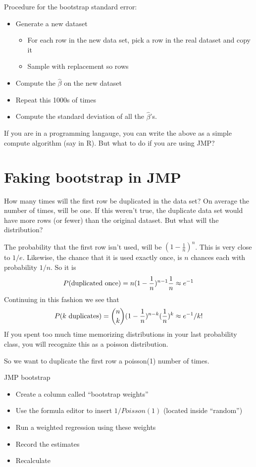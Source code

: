 \documentclass{article}
\begin{document}
Procedure for the bootstrap standard error:
\begin{itemize}
\item Generate a new dataset
\begin{itemize}
\item For each row in the new data set, pick a row in the real dataset
and copy it
\item Sample with replacement so rows 
\end{itemize}
\item Compute the $\hat\beta$ on the new dataset
\item Repeat this 1000s of times
\item Compute the standard deviation of all the $\hat\beta$'s.
\end{itemize}

If you are in a programming langauge, you can write the above as a
simple compute algorithm (say in R).  But what to do if you are using
JMP? 

\section{Faking bootstrap in JMP}

How many times will the first row be duplicated in the data set?  On
average the number of times, will be one.  If this weren't true, the
duplicate data set would have more rows (or fewer) than the original
dataset.  But what will the distribution?

The probability that the first row isn't used, will be
$(1-\frac{1}{n})^n$.  This is very close to $1/e$.  Likewise, the
chance that it is used exactly once, is $n$ chances each with
probability $1/n$.  So it is 
\begin{displaymath}
P(\hbox{duplicated once}) = n (1-\frac{1}{n})^{n-1}\frac{1}{n} \approx e^{-1}
\end{displaymath}
Continuing in this fashion we see that
\begin{displaymath}
P(k \hbox{ duplicates}) = {n \choose k} (1-\frac{1}{n})^{n-k}(\frac{1}{n})^k \approx e^{-1}/k!
\end{displaymath}
If you spent too much time memorizing distributions in your last
probability class, you will recognize this as a poisson distribution. 

So we want to duplicate the first row a poisson(1) number of times.  

JMP bootstrap
\begin{itemize}
\item Create a column called ``bootstrap weights''
\item Use the formula editor to insert $1/Poisson(1)$ (located inside ``random'')
\item Run a weighted regression using these weights
\item Record the estimates
\item Recalculate
\end{itemize}
\end{document}

